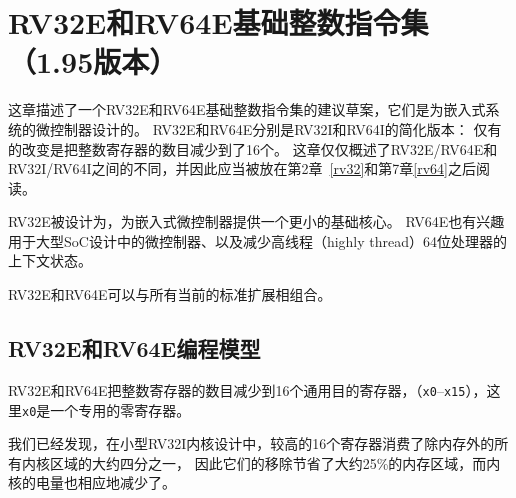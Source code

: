\chapter{RV32E和RV64E基础整数指令集（1.95版本）}
\label{rv32e}

这章描述了一个RV32E和RV64E基础整数指令集的建议草案，它们是为嵌入式系统的微控制器设计的。
RV32E和RV64E分别是RV32I和RV64I的简化版本：
仅有的改变是把整数寄存器的数目减少到了16个。
这章仅仅概述了RV32E/RV64E和RV32I/RV64I之间的不同，并因此应当被放在第2章~\ref{rv32}和第7章\ref{rv64}之后阅读。

\begin{commentary}
RV32E被设计为，为嵌入式微控制器提供一个更小的基础核心。
RV64E也有兴趣用于大型SoC设计中的微控制器、以及减少高线程（highly thread）64位处理器的上下文状态。

RV32E和RV64E可以与所有当前的标准扩展相组合。
\end{commentary}

\section{RV32E和RV64E编程模型}

RV32E和RV64E把整数寄存器的数目减少到16个通用目的寄存器，（{\tt x0}--{\tt x15}），这里{\tt x0}是一个专用的零寄存器。

\begin{commentary}
我们已经发现，在小型RV32I内核设计中，较高的16个寄存器消费了除内存外的所有内核区域的大约四分之一，
因此它们的移除节省了大约25\%的内存区域，而内核的电量也相应地减少了。
\end{commentary}

